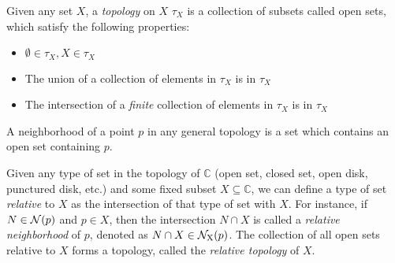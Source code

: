 \begin{definition}
Given any set $X$, a \emph{topology} on $X$ $\tau_X$ is a collection of subsets called open sets, which satisfy the following properties:
\begin{itemize}
\item $\emptyset \in \tau_X, X \in \tau_X$
\item The union of a collection of elements in $\tau_X$ is in $\tau_X$
\item The intersection of a \emph{finite} collection of elements in $\tau_X$ is in $\tau_X$
\end{itemize}
A neighborhood of a point $p$ in any general topology is a set which contains an open set containing $p$.
\end{definition}
\begin{definition}
Given any type of set in the topology of $\mathbb{C}$ (open set, closed set, open disk, punctured disk, etc.) and some fixed subset $X \subseteq \mathbb{C}$, we can define a type of set \emph{relative} to $X$ as the intersection of that type of set with $X$. For instance, if $N \in \nbhd{p}$ and $p \in X$, then the intersection $N \cap X$ is called a \emph{relative neighborhood} of $p$, denoted as $N \cap X \in \rnbhd{p}{X}$. The collection of all open sets relative to $X$ forms a topology, called the \emph{relative topology} of $X$.
\end{definition}
